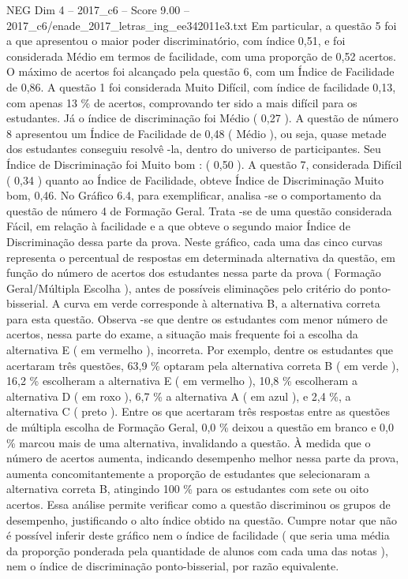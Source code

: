\begin{textsample}{NEG Dim 4 – 2017\_c6 – Score 9.00 – 2017\_c6/enade\_2017\_letras\_ing\_ee342011e3.txt}
Em particular, a questão 5 foi a que apresentou o maior poder discriminatório, com índice 0,51, e foi considerada Médio em termos de facilidade, com uma proporção de 0,52 acertos.
O máximo de acertos foi alcançado pela questão 6, com um Índice de Facilidade de 0,86.
A questão 1 foi considerada Muito Difícil, com índice de facilidade 0,13, com apenas 13 \% de acertos, comprovando ter sido a mais difícil para os estudantes.
Já o índice de discriminação foi Médio ( 0,27 ).
A questão de número 8 apresentou um Índice de Facilidade de 0,48 ( Médio ), ou seja, quase metade dos estudantes conseguiu resolvê -la, dentro do universo de participantes.
Seu Índice de Discriminação foi Muito bom : ( 0,50 ).
A questão 7, considerada Difícil ( 0,34 ) quanto ao Índice de Facilidade, obteve Índice de Discriminação Muito bom, 0,46.
No Gráfico 6.4, para exemplificar, analisa -se o comportamento da questão de número 4 de Formação Geral.
Trata -se de uma questão considerada Fácil, em relação à facilidade e a que obteve o segundo maior Índice de Discriminação dessa parte da prova.
Neste gráfico, cada uma das cinco curvas representa o percentual de respostas em determinada alternativa da questão, em função do número de acertos dos estudantes nessa parte da prova ( Formação Geral/Múltipla Escolha ), antes de possíveis eliminações pelo critério do ponto-bisserial.
A curva em verde corresponde à alternativa B, a alternativa correta para esta questão.
Observa -se que dentre os estudantes com menor número de acertos, nessa parte do exame, a situação mais frequente foi a escolha da alternativa E ( em vermelho ), incorreta.
Por exemplo, dentre os estudantes que acertaram três questões, 63,9 \% optaram pela alternativa correta B ( em verde ), 16,2 \% escolheram a alternativa E ( em vermelho ), 10,8 \% escolheram a alternativa D ( em roxo ), 6,7 \% a alternativa A ( em azul ), e 2,4 \%, a alternativa C ( preto ).
Entre os que acertaram três respostas entre as questões de múltipla escolha de Formação Geral, 0,0 \% deixou a questão em branco e 0,0 \% marcou mais de uma alternativa, invalidando a questão.
À medida que o número de acertos aumenta, indicando desempenho melhor nessa parte da prova, aumenta concomitantemente a proporção de estudantes que selecionaram a alternativa correta B, atingindo 100 \% para os estudantes com sete ou oito acertos.
Essa análise permite verificar como a questão discriminou os grupos de desempenho, justificando o alto índice obtido na questão.
Cumpre notar que não é possível inferir deste gráfico nem o índice de facilidade ( que seria uma média da proporção ponderada pela quantidade de alunos com cada uma das notas ), nem o índice de discriminação ponto-bisserial, por razão equivalente.

\end{textsample}
